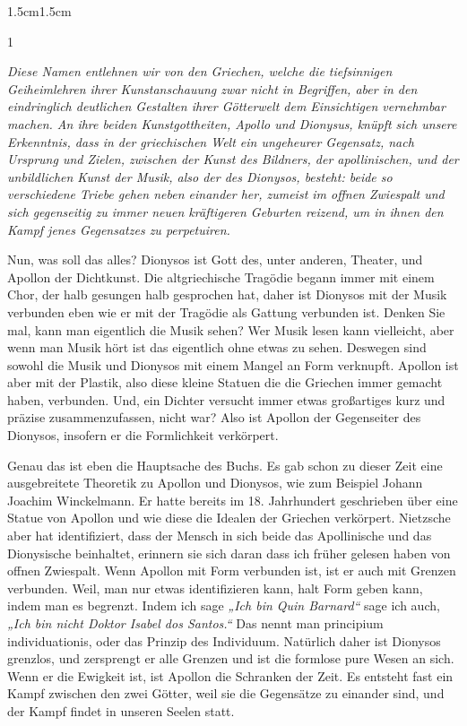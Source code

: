 \documentclass[12pt,a4paper]{article}
\begin{document}
\begin{adjustwidth}{1.5cm}{1.5cm}
    \begin{spacing}{1}
        \begin{center}
            \small
                \textit{Diese Namen entlehnen wir von den Griechen, welche die tiefsinnigen Geiheimlehren ihrer Kunstanschauung zwar nicht in Begriffen, aber in den eindringlich deutlichen Gestalten ihrer Götterwelt dem Einsichtigen vernehmbar machen. An ihre beiden Kunstgottheiten, Apollo und Dionysus, knüpft sich unsere Erkenntnis, dass in der griechischen Welt ein ungeheurer Gegensatz, nach Ursprung und Zielen, zwischen der Kunst des Bildners, der apollinischen, und der unbildlichen Kunst der Musik, also der des Dionysos, besteht: beide so verschiedene Triebe gehen neben einander her, zumeist im offnen Zwiespalt und sich gegenseitig zu immer neuen kräftigeren Geburten reizend, um in ihnen den Kampf jenes Gegensatzes zu perpetuiren.}
        \end{center}
    \end{spacing}
\end{adjustwidth}
Nun, was soll das alles? Dionysos ist Gott des, unter anderen, Theater, und Apollon der Dichtkunst. Die altgriechische Tragödie begann immer mit einem Chor, der halb gesungen halb gesprochen hat, daher ist Dionysos mit der Musik verbunden eben wie er mit der Tragödie als Gattung verbunden ist. Denken Sie mal, kann man eigentlich die Musik sehen? Wer Musik lesen kann vielleicht, aber wenn man Musik hört ist das eigentlich ohne etwas zu sehen. Deswegen sind sowohl die Musik und Dionysos mit einem Mangel an Form verknupft. Apollon ist aber mit der Plastik, also diese kleine Statuen die die Griechen immer gemacht haben, verbunden. Und, ein Dichter versucht immer etwas großartiges kurz und präzise zusammenzufassen, nicht war? Also ist Apollon der Gegenseiter des Dionysos, insofern er die Formlichkeit verkörpert.\par

Genau das ist eben die Hauptsache des Buchs. Es gab schon zu dieser Zeit eine ausgebreitete Theoretik zu Apollon und Dionysos, wie zum Beispiel Johann Joachim Winckelmann. Er hatte bereits im 18. Jahrhundert geschrieben über eine Statue von Apollon und wie diese die Idealen der Griechen verkörpert. Nietzsche aber hat identifiziert, dass der Mensch in sich beide das Apollinische und das Dionysische beinhaltet, erinnern sie sich daran dass ich früher gelesen haben von offnen Zwiespalt. Wenn Apollon mit Form verbunden ist, ist er auch mit Grenzen verbunden. Weil, man nur etwas identifizieren kann, halt Form geben kann, indem man es begrenzt. Indem ich sage \textit{„Ich bin Quin Barnard“} sage ich auch, \textit{„Ich bin nicht Doktor Isabel dos Santos.“} Das nennt man principium individuationis, oder das Prinzip des Individuum. Natürlich daher ist Dionysos grenzlos, und zersprengt er alle Grenzen und ist die formlose pure Wesen an sich. Wenn er die Ewigkeit ist, ist Apollon die Schranken der Zeit. Es entsteht fast ein Kampf zwischen den zwei Götter, weil sie die Gegensätze zu einander sind, und der Kampf findet in unseren Seelen statt.\par
\end{document}
